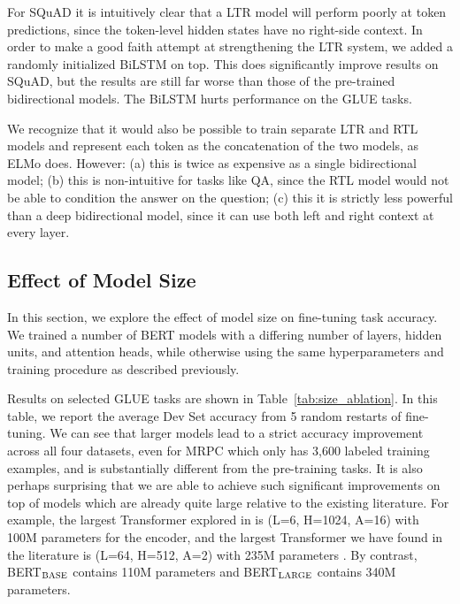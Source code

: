 \documentclass[11pt,a4paper]{article}
\newcommand\bertbase{BERT$_{\small \textsc{BASE}}$\xspace}
\newcommand\bertlarge{BERT$_{\small \textsc{LARGE}}$\xspace}
\begin{document}
For SQuAD it is intuitively clear that a LTR model will perform poorly at token predictions, since the token-level hidden states have no right-side context.
In order to make a good faith attempt at strengthening the LTR system, we added a randomly initialized BiLSTM on top. This does significantly improve results on SQuAD, but the results are still far worse than those of the pre-trained bidirectional models. The BiLSTM hurts performance on the GLUE tasks. 

We recognize that it would also be possible to train separate LTR and RTL models and represent each token as the concatenation of the two models, as ELMo does. However: (a) this is twice as expensive as a single bidirectional model; (b) this is non-intuitive for tasks like QA, since the RTL model would not be able to condition the answer on the question; (c) this it is strictly less powerful than a deep bidirectional model, since it can use both left and right context at every layer.

\subsection{Effect of Model Size}
\label{sec:model_size_ablation}

In this section, we explore the effect of model size on fine-tuning task accuracy. We trained a number of BERT models with a differing number of layers, hidden units, and attention heads, while otherwise using the same hyperparameters and training procedure as described previously.

Results on selected GLUE tasks are shown in Table~\ref{tab:size_ablation}. In this table, we report the average Dev Set accuracy from 5 random restarts of fine-tuning. We can see that larger models lead to a strict accuracy improvement across all four datasets, even for MRPC which only has 3,600 labeled training examples, and is substantially different from the pre-training tasks. It is also perhaps surprising that we are able to achieve such significant improvements on top of models which are already quite large relative to the existing literature. For example, the largest Transformer explored in \citet{vaswani-etal:2017:_atten} is (L=6, H=1024, A=16) with 100M parameters for the encoder, and the largest Transformer we have found in the literature is (L=64, H=512, A=2) with 235M parameters \cite{alrfou:2018}. By contrast, \bertbase contains 110M parameters and \bertlarge contains 340M parameters.
\end{document}
